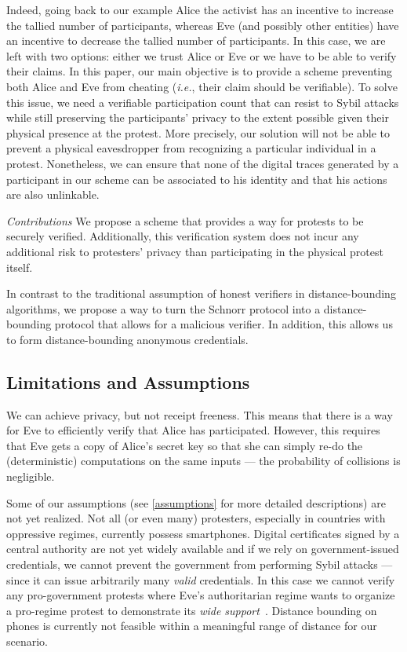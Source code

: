 Indeed, going back to our example Alice the activist has an incentive to increase the tallied number of participants, whereas Eve (and possibly other entities) have an incentive to decrease the tallied number of participants.
In this case, we are left with two options: either we trust Alice or Eve or we have to be able to verify their claims.
In this paper, our main objective is to provide a scheme preventing both Alice and Eve from cheating (\emph{i.e.}, their claim should be verifiable).
To solve this issue, we need a verifiable participation count that can resist to Sybil attacks while still preserving the participants'
privacy to the extent possible given their physical presence at the protest. 
More precisely, our solution will not be able to prevent a physical eavesdropper from recognizing a particular individual in a protest. 
Nonetheless, we can ensure that none of the digital traces generated by a participant in our scheme can be associated to his identity and that his actions are also unlinkable.

\emph{Contributions} We propose a scheme that provides a way for protests to be securely verified.
Additionally, this verification system does not incur any additional risk to 
protesters' privacy than participating in the physical protest itself.

In contrast to the traditional assumption of honest verifiers in
distance-bounding algorithms, we propose a way to turn the Schnorr
protocol into a distance-bounding protocol that allows for a malicious
verifier. In addition, this allows us to form distance-bounding
anonymous credentials.

\subsection{Limitations and Assumptions}

We can achieve privacy, but not receipt freeness.
This means that there is a way for Eve to efficiently verify that Alice has 
participated.
However, this requires that Eve gets a copy of Alice's secret key so that she 
can simply re-do the (deterministic) computations on the same inputs --- the 
probability of collisions is negligible.


Some of our assumptions (see \cref{assumptions} for more
detailed descriptions) are not yet
realized. Not all (or even many) protesters, especially in countries
with oppressive regimes, currently possess smartphones. Digital
certificates signed by a central authority are not yet widely
available and if we rely on government-issued credentials, we cannot prevent the government 
from performing Sybil attacks --- since it can issue arbitrarily many 
\emph{valid} credentials. In this case we cannot verify any pro-government protests where Eve's authoritarian regime wants to organize a pro-regime protest to 
demonstrate its \emph{wide 
  support}~\cite[e.g.][]{AlJazeeraOnVenezuela2017,VenezuelanStateWorkersCalledToParticipate}.
Distance bounding on phones is currently not feasible within a
meaningful range of distance for our scenario. 

